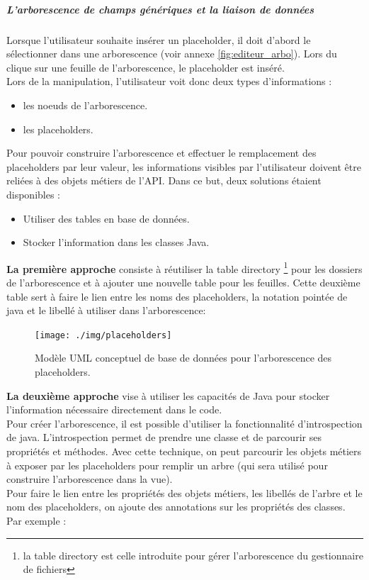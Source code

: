 \subparagraph*{L'arborescence de champs génériques et la liaison de données}

Lorsque l'utilisateur souhaite insérer un placeholder, il doit d'abord le sélectionner dans une arborescence (voir annexe \ref{fig:editeur_arbo}). 
Lors du clique sur une feuille de l'arborescence, le placeholder est inséré.  \\

Lors de la manipulation, l'utilisateur voit donc deux types d'informations : 
\begin{itemize}
\item les noeuds de l'arborescence.
\item les placeholders.
\end{itemize}

Pour pouvoir construire l'arborescence et effectuer le remplacement des placeholders par leur valeur, les informations visibles par l'utilisateur doivent être reliées à des objets métiers de l'API.
Dans ce but, deux solutions étaient disponibles : 
\begin{itemize}
\item Utiliser des tables en base de données.
\item Stocker l'information dans les classes Java. %
\end{itemize}

\textbf{La première approche} consiste à réutiliser la table directory \footnote{la table directory est celle introduite pour gérer l'arborescence du gestionnaire de fichiers} pour les dossiers de l'arborescence et à ajouter une nouvelle table pour les feuilles. Cette deuxième table sert à faire le lien entre les noms des placeholders, la notation pointée de java et le libellé à utiliser dans l'arborescence:\\

\begin{figure}[H]
  \centering
  \texttt{[image: ./img/placeholders]}
  \caption{\label{fig:mb_va_ast} Modèle UML conceptuel de base de données pour l'arborescence des placeholders.}
\end{figure}


\textbf{La deuxième approche} vise à utiliser les capacités de Java pour stocker l'information nécessaire directement dans le code.\\
Pour créer l'arborescence, il est possible d'utiliser la fonctionnalité d'introspection de java. L'introspection permet de prendre une classe et de parcourir ses propriétés et méthodes. Avec cette technique, on peut parcourir les objets métiers à exposer par les placeholders pour remplir un arbre (qui sera utilisé pour construire l'arborescence dans la vue). \\
Pour faire le lien entre les propriétés des objets métiers, les libellés de l'arbre et le nom des placeholders, on ajoute des annotations sur les propriétés des classes.\\
Par exemple :

